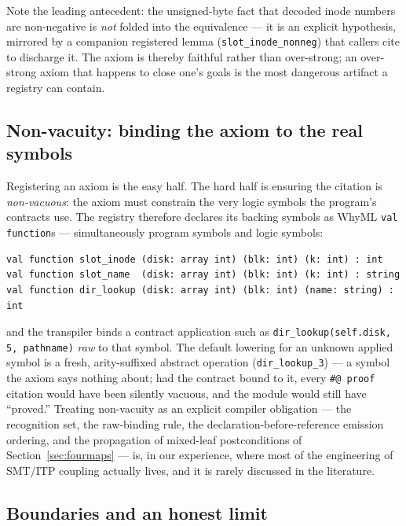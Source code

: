 \documentclass[11pt]{article}
\newcommand{\whyml}{\textsf{WhyML}}
\begin{document}
\noindent
Note the leading antecedent: the unsigned-byte fact that decoded inode
numbers are non-negative is \emph{not} folded into the equivalence --- it is
an explicit hypothesis, mirrored by a companion registered lemma
(\texttt{slot\_inode\_nonneg}) that callers cite to discharge it. The axiom
is thereby faithful rather than over-strong; an over-strong axiom that
happens to close one's goals is the most dangerous artifact a registry can
contain.

\subsection{Non-vacuity: binding the axiom to the real symbols}

Registering an axiom is the easy half. The hard half is ensuring the
citation is \emph{non-vacuous}: the axiom must constrain the very logic
symbols the program's contracts use. The registry therefore declares its
backing symbols as \whyml{} \texttt{val function}s --- simultaneously program
symbols and logic symbols:

\begin{lstlisting}
val function slot_inode (disk: array int) (blk: int) (k: int) : int
val function slot_name  (disk: array int) (blk: int) (k: int) : string
val function dir_lookup (disk: array int) (blk: int) (name: string) : int
\end{lstlisting}

\noindent
and the transpiler binds a contract application such as
\texttt{dir\_lookup(self.disk, 5, pathname)} \emph{raw} to that symbol. The
default lowering for an unknown applied symbol is a fresh, arity-suffixed
abstract operation (\texttt{dir\_lookup\_3}) --- a symbol the axiom says
nothing about; had the contract bound to it, every \texttt{\#@ proof}
citation would have been silently vacuous, and the module would still have
``proved.'' Treating non-vacuity as an explicit compiler obligation --- the
recognition set, the raw-binding rule, the declaration-before-reference
emission ordering, and the propagation of mixed-leaf postconditions of
Section~\ref{sec:fourmaps} --- is, in our experience, where most of the
engineering of SMT/ITP coupling actually lives, and it is rarely discussed
in the literature.

\subsection{Boundaries and an honest limit}
\label{sec:boundaries}
\end{document}
